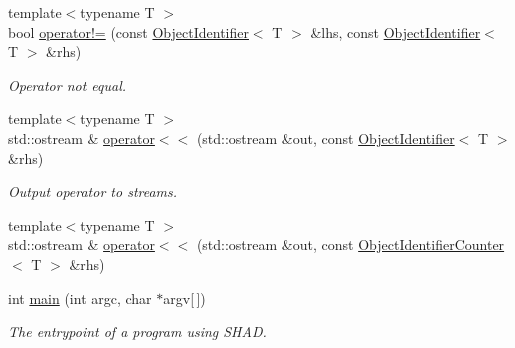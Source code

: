 \begin{DoxyCompactItemize}
{\footnotesize template$<$typename T $>$ }\\bool \hyperlink{namespaceshad_a73513752568c47bd71b06a4fc328eec4}{operator!=} (const \hyperlink{classshad_1_1ObjectIdentifier}{Object\-Identifier}$<$ T $>$ \&lhs, const \hyperlink{classshad_1_1ObjectIdentifier}{Object\-Identifier}$<$ T $>$ \&rhs)
\begin{DoxyCompactList}\small\item\em Operator not equal. \end{DoxyCompactList}\item 
{\footnotesize template$<$typename T $>$ }\\std\-::ostream \& \hyperlink{namespaceshad_a5761ac18b234d1551ab55f1ce32214cb}{operator$<$$<$} (std\-::ostream \&out, const \hyperlink{classshad_1_1ObjectIdentifier}{Object\-Identifier}$<$ T $>$ \&rhs)
\begin{DoxyCompactList}\small\item\em Output operator to streams. \end{DoxyCompactList}\item 
{\footnotesize template$<$typename T $>$ }\\std\-::ostream \& \hyperlink{namespaceshad_aa50b0a9ddf671edce6ba55be6975896a}{operator$<$$<$} (std\-::ostream \&out, const \hyperlink{classshad_1_1ObjectIdentifierCounter}{Object\-Identifier\-Counter}$<$ T $>$ \&rhs)
\item 
int \hyperlink{namespaceshad_a9f30a41da5e389095d44fe5b1c9e6f5e}{main} (int argc, char $\ast$argv\mbox{[}$\,$\mbox{]})
\begin{DoxyCompactList}\small\item\em The entrypoint of a program using S\-H\-A\-D. \end{DoxyCompactList}\end{DoxyCompactItemize}


